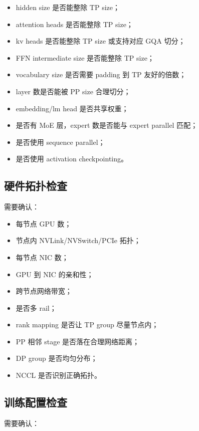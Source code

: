 \begin{itemize}
\item hidden size 是否能整除 TP size；
\item attention heads 是否能整除 TP size；
\item kv heads 是否能整除 TP size 或支持对应 GQA 切分；
\item FFN intermediate size 是否能整除 TP size；
\item vocabulary size 是否需要 padding 到 TP 友好的倍数；
\item layer 数是否能被 PP size 合理切分；
\item embedding/lm head 是否共享权重；
\item 是否有 MoE 层，expert 数是否能与 expert parallel 匹配；
\item 是否使用 sequence parallel；
\item 是否使用 activation checkpointing。
\end{itemize}

\subsection{硬件拓扑检查}
\label{subsec:hardware-topology-checklist}

需要确认：

\begin{itemize}
\item 每节点 GPU 数；
\item 节点内 NVLink/NVSwitch/PCIe 拓扑；
\item 每节点 NIC 数；
\item GPU 到 NIC 的亲和性；
\item 跨节点网络带宽；
\item 是否多 rail；
\item rank mapping 是否让 TP group 尽量节点内；
\item PP 相邻 stage 是否落在合理网络距离；
\item DP group 是否均匀分布；
\item NCCL 是否识别正确拓扑。
\end{itemize}

\subsection{训练配置检查}
\label{subsec:training-config-checklist}

需要确认：

